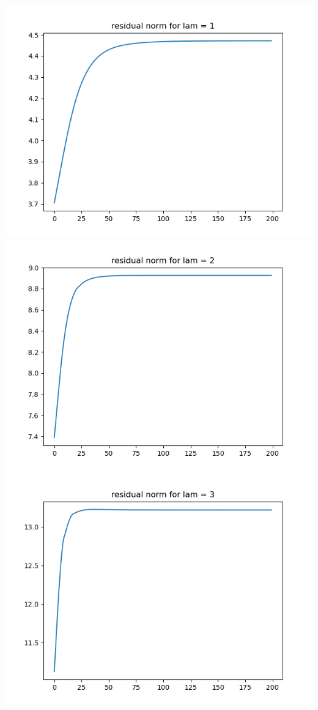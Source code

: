 \documentclass{article}
\begin{document}
\begin{enumerate}
\begin{enumerate}
\begin{center}
			\includegraphics[scale=.3]{hw7p1b residual norm for lamcount = 6}
			\includegraphics[scale=.3]{hw7p1b residual norm for lamcount = 7}
			\includegraphics[scale=.3]{hw7p1b residual norm for lamcount = 8}

\end{center}
\end{enumerate}
\end{enumerate}
\end{document}
